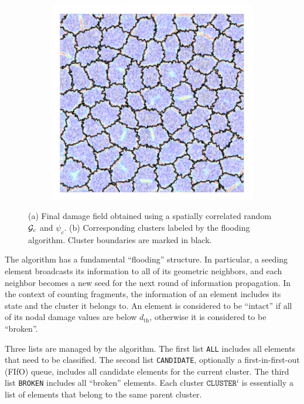\begin{figure}[htb!]
\begin{subfigure}[b]{0.36\textwidth}
    \includegraphics[width=\textwidth]{Appendices/figures/cluster.png}
    \vspace{-0.06in}
    \caption{}
  \end{subfigure}
  \caption{ (a) Final damage field obtained using a spatially correlated random ${\mathcal{G}_c}$ and $\psi_c$. (b) Corresponding clusters labeled by the flooding algorithm. Cluster boundaries are marked in black. }
  \label{fig: clustering}
\end{figure}

The algorithm has a fundamental ``flooding'' structure.  In particular, a seeding element broadcasts its information to all of its geometric neighbors, and each neighbor becomes a new seed for the next round of information propagation. In the context of counting fragments, the information of an element includes its state and the cluster it belongs to. An element is considered to be ``intact'' if all of its nodal damage values are below $d_{\text{th}}$, otherwise it is considered to be ``broken''.

Three lists are managed by the algorithm. The first list \texttt{ALL} includes all elements that need to be classified. The second list \texttt{CANDIDATE}, optionally a first-in-first-out (FIfO) queue, includes all candidate elements for the current cluster. The third list \texttt{BROKEN} includes all ``broken'' elements. Each cluster $\texttt{CLUSTER}^i$ is essentially a list of elements that belong to the same parent cluster.

